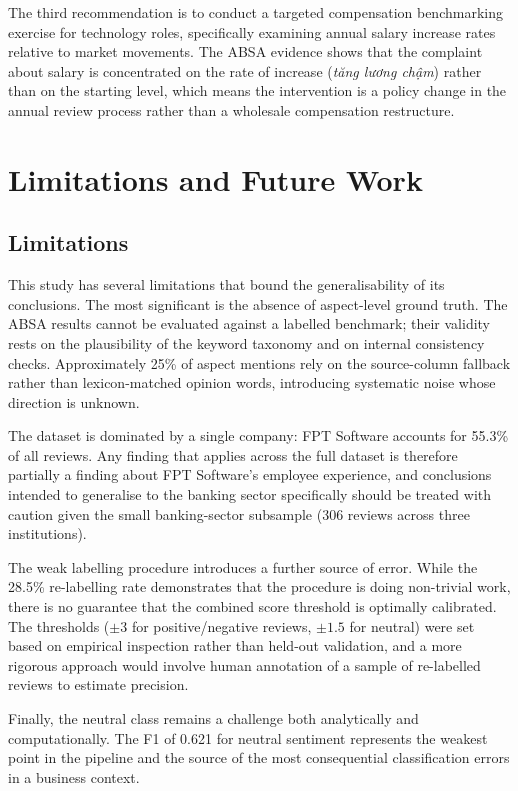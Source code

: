 \documentclass[12pt, a4paper]{article}
\begin{document}
The third recommendation is to conduct a targeted compensation benchmarking exercise for technology roles, specifically examining annual salary increase rates relative to market movements. The ABSA evidence shows that the complaint about salary is concentrated on the rate of increase (\textit{tăng lương chậm}) rather than on the starting level, which means the intervention is a policy change in the annual review process rather than a wholesale compensation restructure.

\section{Limitations and Future Work}

\subsection{Limitations}

This study has several limitations that bound the generalisability of its conclusions. The most significant is the absence of aspect-level ground truth. The ABSA results cannot be evaluated against a labelled benchmark; their validity rests on the plausibility of the keyword taxonomy and on internal consistency checks. Approximately 25\% of aspect mentions rely on the source-column fallback rather than lexicon-matched opinion words, introducing systematic noise whose direction is unknown.

The dataset is dominated by a single company: FPT Software accounts for 55.3\% of all reviews. Any finding that applies across the full dataset is therefore partially a finding about FPT Software's employee experience, and conclusions intended to generalise to the banking sector specifically should be treated with caution given the small banking-sector subsample (306 reviews across three institutions).

The weak labelling procedure introduces a further source of error. While the 28.5\% re-labelling rate demonstrates that the procedure is doing non-trivial work, there is no guarantee that the combined score threshold is optimally calibrated. The thresholds ($\pm 3$ for positive/negative reviews, $\pm 1.5$ for neutral) were set based on empirical inspection rather than held-out validation, and a more rigorous approach would involve human annotation of a sample of re-labelled reviews to estimate precision.

Finally, the neutral class remains a challenge both analytically and computationally. The F1 of 0.621 for neutral sentiment represents the weakest point in the pipeline and the source of the most consequential classification errors in a business context.
\end{document}
